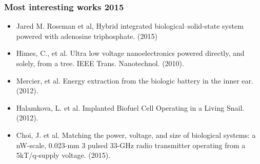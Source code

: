 \documentclass[12pt]{beamer}
\begin{document}

\begin{frame}
\frametitle{Most interesting works 2015}
\begin{itemize}
\item Jared M. Roseman et al, Hybrid integrated biological–solid-state system powered with adenosine triphosphate. (2015)
\item Himes, C., et al. Ultra low voltage nanoelectronics powered directly, and solely, from a tree. IEEE Trans. Nanotechnol. (2010).
\item Mercier, et al. Energy extraction from the biologic battery in the inner ear. (2012).
\item Halamkova, L. et al. Implanted Biofuel Cell Operating in a Living Snail. (2012).
\item Choi, J. et al. Matching the power, voltage, and size of biological systems: a nW-scale, 0.023-mm 3 pulsed 33-GHz radio transmitter operating from a 5kT/q-supply voltage. (2015).
\end{itemize}
\end{frame}

\end{document}
